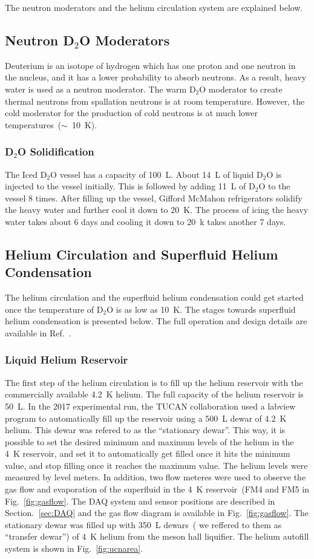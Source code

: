 The neutron moderators and the
helium circulation system are explained below.


\subsection{Neutron D$_2$O Moderators}
Deuterium is an isotope of hydrogen which has one proton and one
neutron in the nucleus, and it has a lower probability to absorb
neutrons. As a result, heavy water is used as a neutron moderator. The
warm D$_2$O moderator to create thermal neutrons from spallation
neutrons is at room temperature. However, the cold moderator for the
production of cold neutrons is at much lower
temperatures~($\sim$~10~K).

\subsubsection{D$_2$O Solidification}
The Iced D$_2$O vessel has a capacity of 100~L. About 14~L of liquid
D$_2$O is injected to the vessel initially. This is followed by adding 11~L of
D$_2$O to the vessel 8 times.  After filling up the vessel,
Gifford McMahon refrigerators solidify the heavy water and further
cool it down to 20~K. The process of icing the heavy water takes about
6 days and cooling it down to 20~k takes another 7 days.


\subsection{Helium Circulation and Superfluid Helium Condensation}
The helium circulation and the superfluid helium condensation could
get started once the temperature of D$_2$O is as low as 10~K. The
stages towards superfluid helium condensation is presented below. The
full operation and design details are available in
Ref.~\cite{matsumiya_thesis}.

\subsubsection{Liquid Helium Reservoir}
The first step of the helium circulation is to fill up the helium
reservoir with the commercially available 4.2~K helium. The full
capacity of the helium reservoir is 50~L. In the 2017 experimental
run, the TUCAN collaboration used a labview program to automatically
fill up the reservoir using a 500~L dewar of 4.2~K helium. This dewar
was refered to as the ``stationary dewar''. This way, it is possible
to set the desired minimum and maximum levels of the helium in the 4~K
reservoir, and set it to automatically get filled once it hits the
minimum value, and stop filling once it reaches the maximum value. The
helium levels were measured by level meters. In addition, two flow
meteres were used to observe the gas flow and evaporation of the
superfluid in the 4~K reservoir~(FM4 and FM5 in
Fig.~\ref{fig:gasflow}. The DAQ system and sensor positions are
described in Section.~\ref{sec:DAQ} and the gas flow diagram is
available in Fig.~\ref{fig:gasflow}. The stationary dewar was filled
up with 350~L dewars~( we reffered to them as ``transfer dewar'') of
4~K helium from the meson hall liquifier. The helium autofill system
is shown in Fig.~\ref{fig:ucnarea}.

